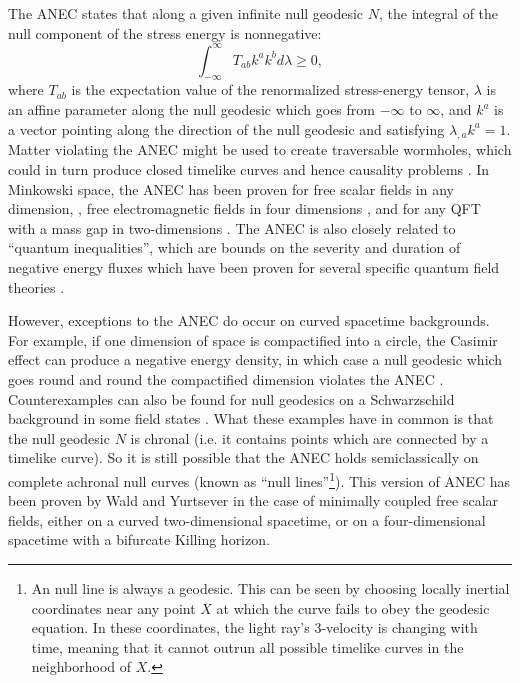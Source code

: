 \documentclass[11pt]{article}
\begin{document}
The ANEC states that along a given infinite null geodesic $N$, the integral of the null component of the stress energy is nonnegative:
\begin{equation}\label{anec}
\int^{\infty}_{-\infty} T_{ab} k^a k^b d\lambda \ge 0,
\end{equation}
where $T_{ab}$ is the expectation value of the renormalized stress-energy tensor, $\lambda$ is an affine parameter along the null geodesic which goes from $-\infty$ to $\infty$, and $k^a$ is a vector pointing along the direction of the null geodesic and satisfying $\lambda_{,a} k^a = 1$.  Matter violating the ANEC might be used to create traversable wormholes, which could in turn produce closed timelike curves and hence causality problems \cite{MTY88}\cite{FSW93}.  In Minkowski space, the ANEC has been proven for free scalar fields in any dimension, \cite{klink91}, free electromagnetic fields in four dimensions \cite{folacci92}, and for any QFT with a mass gap in two-dimensions \cite{verch00}.  The ANEC is also closely related to ``quantum inequalities'', which are bounds on the severity and duration of negative energy fluxes which have been proven for several specific quantum field theories \cite{FR95}.

However, exceptions to the ANEC do occur on curved spacetime backgrounds.  For example, if one dimension of space is compactified into a circle, the Casimir effect can produce a negative energy density, in which case a null geodesic which goes round and round the compactified dimension violates the ANEC \cite{klink91}.  Counterexamples can also be found for null geodesics on a Schwarzschild background in some field states \cite{visser96}.  What these examples have in common is that the null geodesic $N$ is chronal (i.e. it contains points which are connected by a timelike curve).  So it is still possible that the ANEC holds semiclassically on complete achronal null curves (known as ``null lines''\footnote{An null line is always a geodesic.  This can be seen by choosing locally inertial coordinates near any point $X$ at which the curve fails to obey the geodesic equation.  In these coordinates, the light ray's 3-velocity is changing with time, meaning that it cannot outrun all possible timelike curves in the neighborhood of $X$.}).  This version of ANEC has been proven by Wald and Yurtsever \cite{WY91} in the case of minimally coupled free scalar fields, either on a curved two-dimensional spacetime, or on a four-dimensional spacetime with a bifurcate Killing horizon.
\end{document}
